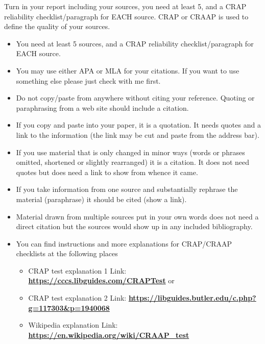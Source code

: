 \documentclass[12pt]{article}
\begin{document}
    Turn in your report including your sources, you need at least 5, and a CRAP reliability checklist/paragraph for EACH  source. CRAP or CRAAP is used to define the quality of your sources. 
    \begin{itemize}

        \item You need at least 5 sources, and a CRAP reliability checklist/paragraph for EACH  source. 
        \item You may use either APA or MLA for your citations. If you want to use something else please just check with me first.
        \item Do not copy/paste from anywhere without citing your reference. Quoting or paraphrasing from a web site should include a citation.
        \item If you copy and paste into your paper, it is a quotation. It needs quotes and a link to the information (the link may be cut and paste from the address bar).
        \item If you use material that is only changed in minor ways (words or phrases omitted, shortened or slightly rearranged) it is a citation. It does not need quotes but does need a link to show from whence it came.
        \item If you take information from one source and substantially rephrase the material (paraphrase) it should be cited (show a link).
        \item Material drawn from multiple sources put in your own words does not need a direct citation but the sources would show up in any included bibliography.
         \item You can find instructions and more explanations for CRAP/CRAAP checklists at the following places
        \begin{itemize}
            \item CRAP test explanation 1 Link: \href{https://cccs.libguides.com/CRAPTest}{\textbf{https://cccs.libguides.com/CRAPTest}} or 
            \item CRAP test explanation 2 Link: \href{https://libguides.butler.edu/c.php?g=117303&p=1940068}{\textbf{https://libguides.butler.edu/c.php?g=117303&p=1940068}} 
            \item Wikipedia explanation Link: \href{https://en.wikipedia.org/wiki/CRAAP_test}{\textbf{https://en.wikipedia.org/wiki/CRAAP_test}}
        \end{itemize}
    \end{itemize}  
\end{document}
